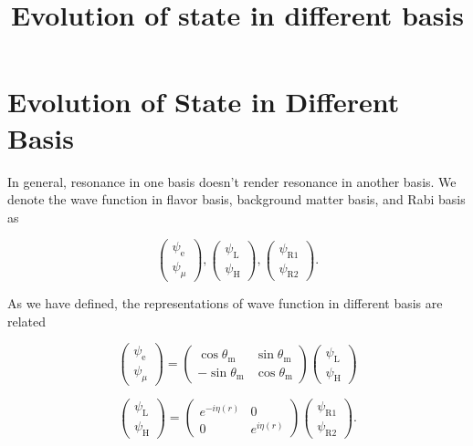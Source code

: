 \documentclass[%
preprint,
 amsmath,amssymb,
 prd,
]{revtex4-1}
\begin{document}
\title{Evolution of state in different basis}
\author{}
\date{}



\maketitle

\section{Evolution of State in Different Basis}

In general, resonance in one basis doesn't render resonance in another basis. We denote the wave function in flavor basis, background matter basis, and Rabi basis as 

\begin{equation}
    \begin{pmatrix}
    \psi_{\mathrm e} \\
    \psi_{\mu}
    \end{pmatrix},
    \begin{pmatrix}
    \psi_{\mathrm L} \\
    \psi_{\mathrm H}
    \end{pmatrix},
    \begin{pmatrix}
    \psi_{\mathrm R1} \\
    \psi_{\mathrm R2}
    \end{pmatrix}.
\end{equation}


As we have defined, the representations of wave function in different basis are related

\begin{equation}
    \begin{pmatrix}
    \psi_{\mathrm e} \\
    \psi_{\mu}
    \end{pmatrix} = 
    \begin{pmatrix}
    \cos \theta_{\mathrm m} & \sin \theta_{\mathrm m}\\
    -\sin \theta_{\mathrm m} & \cos \theta_{\mathrm m}
    \end{pmatrix}
    \begin{pmatrix}
    \psi_{\mathrm L} \\
    \psi_{\mathrm H}
    \end{pmatrix}
\end{equation}

\begin{equation}
    \begin{pmatrix}
    \psi_{\mathrm L} \\
    \psi_{\mathrm H}
    \end{pmatrix}= 
    \begin{pmatrix}
    e^{-i \eta(r)} & 0\\
    0 & e^{i\eta(r)}
    \end{pmatrix}
     \begin{pmatrix}
    \psi_{\mathrm R1} \\
    \psi_{\mathrm R2}
    \end{pmatrix}.
\end{equation}
\end{document}

